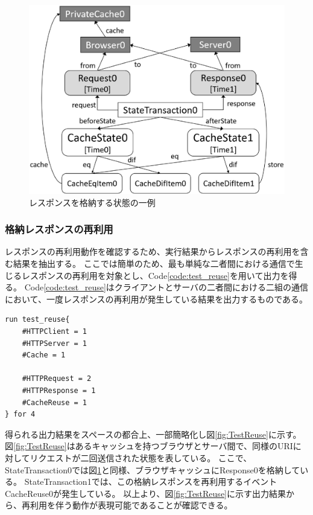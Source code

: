 \documentclass[journal]{IEEEtran}
\begin{document}
\begin{figure}[htb]
\centering
\includegraphics[width=\hsize]{./fig/TestStore.eps}
\caption{レスポンスを格納する状態の一例}
\label{fig:TestStore}
\end{figure}

\subsubsection{格納レスポンスの再利用}
レスポンスの再利用動作を確認するため、実行結果からレスポンスの再利用を含む結果を抽出する。
ここでは簡単のため、最も単純な二者間における通信で生じるレスポンスの再利用を対象とし、Code\ref{code:test_reuse}を用いて出力を得る。
Code\ref{code:test_reuse}はクライアントとサーバの二者間における二組の通信において、一度レスポンスの再利用が発生している結果を出力するものである。

\begin{lstlisting}[caption=格納レスポンスの再利用, label=code:test_reuse]
run test_reuse{
	#HTTPClient = 1
	#HTTPServer = 1
	#Cache = 1

	#HTTPRequest = 2
	#HTTPResponse = 1
	#CacheReuse = 1
} for 4
\end{lstlisting}

得られる出力結果をスペースの都合上、一部簡略化し図\ref{fig:TestReuse}に示す。
図\ref{fig:TestReuse}はあるキャッシュを持つブラウザとサーバ間で、同様のURIに対してリクエストが二回送信された状態を表している。
ここで、StateTransaction0では図\ref{fig:TestStore}と同様、ブラウザキャッシュにResponse0を格納している。
StateTransaction1では、この格納レスポンスを再利用するイベントCacheReuse0が発生している。
以上より、図\ref{fig:TestReuse}に示す出力結果から、再利用を伴う動作が表現可能であることが確認できる。
\end{document}
